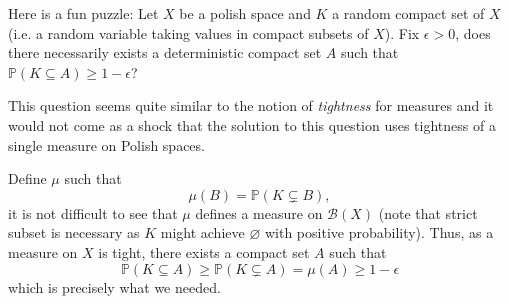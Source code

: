 \documentclass{article}
\begin{document}
Here is a fun puzzle:
Let \(X\) be a polish space and \(K\) a random compact set of \(X\) (i.e. a random variable taking values
in compact subsets of \(X\)). Fix \(\epsilon > 0\), does there necessarily exists a deterministic compact
set \(A\) such that \(\mathbb{P}(K \subseteq A) \ge 1 - \epsilon\)?

This question seems quite similar to the notion of \textit{tightness} for measures and it would not
come as a shock that the solution to this question uses tightness of a single measure on Polish spaces.

Define \(\mu\) such that
\[\mu(B) = \mathbb{P}(K \subsetneq B),\]
it is not difficult to see that \(\mu\) defines a measure on \(\mathcal{B}(X)\) (note that strict subset
is necessary as \(K\) might achieve \(\varnothing\) with positive probability).
Thus, as a measure on \(X\) is tight, there exists a compact set \(A\) such that
\[\mathbb{P}(K \subseteq A) \ge \mathbb{P}(K \subsetneq A) = \mu(A) \ge 1 - \epsilon\]
which is precisely what we needed.
\end{document}
